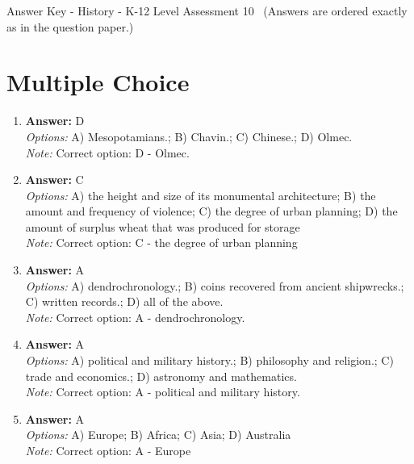 \documentclass[12pt]{article}
\begin{document}
\begin{center}
Answer Key - History - K-12 Level Assessment 10 \
\small (Answers are ordered exactly as in the question paper.)
\end{center}

\section*{Multiple Choice}
\begin{enumerate}[label=\arabic*.]
\item \textbf{Answer:} D
\\ \textit{Options:} A) Mesopotamians.; B) Chavin.; C) Chinese.; D) Olmec.
\\ \textit{Note:} Correct option: D - Olmec.
\item \textbf{Answer:} C
\\ \textit{Options:} A) the height and size of its monumental architecture; B) the amount and frequency of violence; C) the degree of urban planning; D) the amount of surplus wheat that was produced for storage
\\ \textit{Note:} Correct option: C - the degree of urban planning
\item \textbf{Answer:} A
\\ \textit{Options:} A) dendrochronology.; B) coins recovered from ancient shipwrecks.; C) written records.; D) all of the above.
\\ \textit{Note:} Correct option: A - dendrochronology.
\item \textbf{Answer:} A
\\ \textit{Options:} A) political and military history.; B) philosophy and religion.; C) trade and economics.; D) astronomy and mathematics.
\\ \textit{Note:} Correct option: A - political and military history.
\item \textbf{Answer:} A
\\ \textit{Options:} A) Europe; B) Africa; C) Asia; D) Australia
\\ \textit{Note:} Correct option: A - Europe
\end{enumerate}
\end{document}
